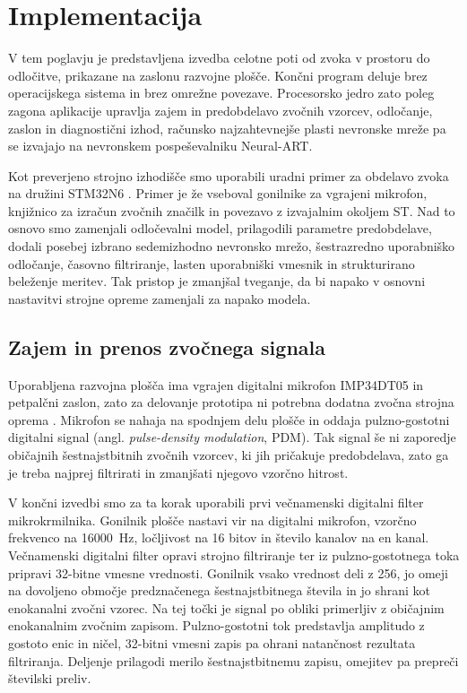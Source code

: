 \chapter{Implementacija}
\label{ch:implementacija}

V tem poglavju je predstavljena izvedba celotne poti od zvoka v prostoru do
odločitve, prikazane na zaslonu razvojne plošče. Končni program deluje brez
operacijskega sistema in brez omrežne povezave. Procesorsko jedro zato poleg
zagona aplikacije upravlja zajem in predobdelavo zvočnih vzorcev, odločanje,
zaslon in diagnostični izhod, računsko najzahtevnejše plasti nevronske mreže
pa se izvajajo na nevronskem pospeševalniku Neural-ART.

Kot preverjeno strojno izhodišče smo uporabili uradni primer za obdelavo zvoka
na družini STM32N6 \cite{ststm32n6audio}. Primer je že vseboval gonilnike za
vgrajeni mikrofon, knjižnico za izračun zvočnih značilk in povezavo z izvajalnim
okoljem ST. Nad to osnovo smo zamenjali odločevalni model, prilagodili parametre
predobdelave, dodali posebej izbrano sedemizhodno nevronsko mrežo,
šestrazredno uporabniško odločanje, časovno filtriranje, lasten
uporabniški vmesnik in strukturirano beleženje meritev. Tak pristop je zmanjšal
tveganje, da bi napako v osnovni nastavitvi strojne opreme zamenjali za napako
modela.

\section{Zajem in prenos zvočnega signala}

Uporabljena razvojna plošča ima vgrajen digitalni mikrofon IMP34DT05 in
petpalčni zaslon, zato za delovanje prototipa ni potrebna dodatna zvočna
strojna oprema \cite{st2024stm32n6570dk}. Mikrofon se nahaja na spodnjem delu
plošče in oddaja pulzno-gostotni digitalni signal (angl. \emph{pulse-density
modulation}, PDM). Tak signal še ni zaporedje običajnih šestnajstbitnih zvočnih
vzorcev, ki jih pričakuje predobdelava, zato ga je treba najprej filtrirati in
zmanjšati njegovo vzorčno hitrost.

V končni izvedbi smo za ta korak uporabili prvi večnamenski digitalni filter
mikrokrmilnika. Gonilnik plošče nastavi vir na digitalni mikrofon, vzorčno
frekvenco na \SI{16000}{\hertz}, ločljivost na 16 bitov in število kanalov na
en kanal. Večnamenski digitalni filter opravi strojno filtriranje ter iz
pulzno-gostotnega toka pripravi 32-bitne vmesne vrednosti. Gonilnik vsako
vrednost deli z 256, jo omeji na dovoljeno območje predznačenega
šestnajstbitnega števila in jo shrani kot enokanalni zvočni vzorec. Na tej
točki je signal po obliki primerljiv z običajnim enokanalnim zvočnim zapisom.
Pulzno-gostotni tok predstavlja amplitudo z gostoto enic in ničel, 32-bitni
vmesni zapis pa ohrani natančnost rezultata filtriranja. Deljenje prilagodi
merilo šestnajstbitnemu zapisu, omejitev pa prepreči številski preliv.

